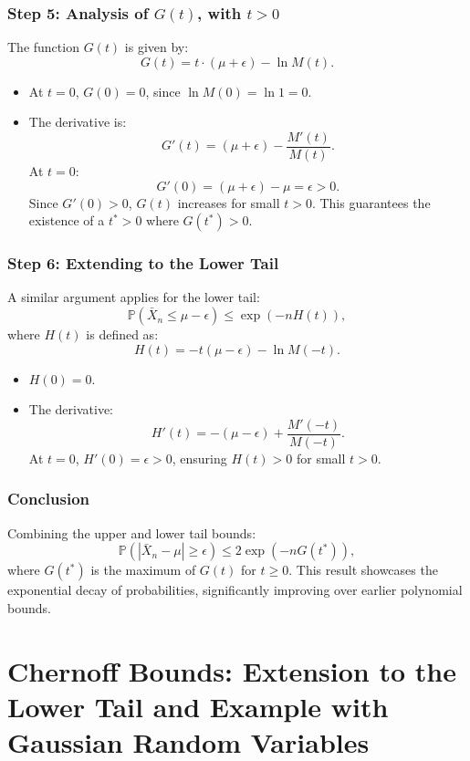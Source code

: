 \subsubsection{Step 5: Analysis of \( G(t) \), with $t>0$}
The function \( G(t) \) is given by:
\[
G(t) = t \cdot (\mu + \epsilon) - \ln M(t).
\]
\begin{itemize}
    \item At \( t = 0 \), \( G(0) = 0 \), since \( \ln M(0) = \ln 1 = 0 \).
    \item The derivative is:
    \[
    G'(t) = (\mu + \epsilon) - \frac{M'(t)}{M(t)}.
    \]
    At \( t = 0 \):
    \[
    G'(0) = (\mu + \epsilon) - \mu = \epsilon > 0.
    \]
    Since \( G'(0) > 0 \), \( G(t) \) increases for small \( t > 0 \). This guarantees the existence of a \( t^* > 0 \) where \( G(t^*) > 0 \).
\end{itemize}

\subsubsection{Step 6: Extending to the Lower Tail}
A similar argument applies for the lower tail:
\[
\mathbb{P}(\bar{X}_n \leq \mu - \epsilon) \leq \exp\left(-n H(t)\right),
\]
where \( H(t) \) is defined as:
\[
H(t) = -t (\mu - \epsilon) - \ln M(-t).
\]
\begin{itemize}
    \item \( H(0) = 0 \).
    \item The derivative:
    \[
    H'(t) = -(\mu - \epsilon) + \frac{M'(-t)}{M(-t)}.
    \]
    At \( t = 0 \), \( H'(0) = \epsilon > 0 \), ensuring \( H(t) > 0 \) for small \( t > 0 \).
\end{itemize}

\subsubsection{Conclusion}
Combining the upper and lower tail bounds:
\[
\mathbb{P}(|\bar{X}_n - \mu| \geq \epsilon) \leq 2 \exp\left(-n G(t^*)\right),
\]
where \( G(t^*) \) is the maximum of \( G(t) \) for \( t \geq 0 \). This result showcases the exponential decay of probabilities, significantly improving over earlier polynomial bounds.

\section{Chernoff Bounds: Extension to the Lower Tail and Example with Gaussian Random Variables}

